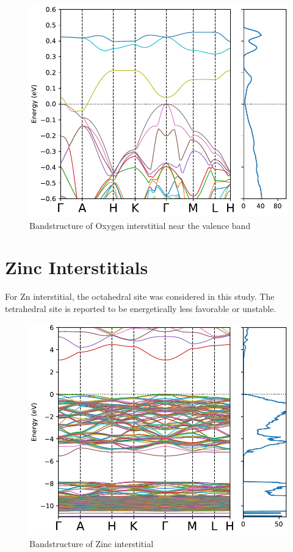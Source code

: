 \begin{figure}[tbh!]
	\centering
	\includegraphics[width=0.6\linewidth]{"images/rnd/band-dos-close_O_i"}
	\caption[Bandstructure of Oxygen interstitial near the valence band]{Bandstructure of Oxygen interstitial near the valence band}
\end{figure}

\clearpage

\section{Zinc Interstitials}

For Zn interstitial, the octahedral site was considered in this study. The tetrahedral site is reported to be energetically less favorable or unstable. 

\begin{figure}[tbh!]
	\centering
	\includegraphics[width=0.6\linewidth]{"images/rnd/band-dos_Zn_i"}
	\caption[Bandstructure of Zinc interstitial]{Bandstructure of Zinc interstitial}
\end{figure}

